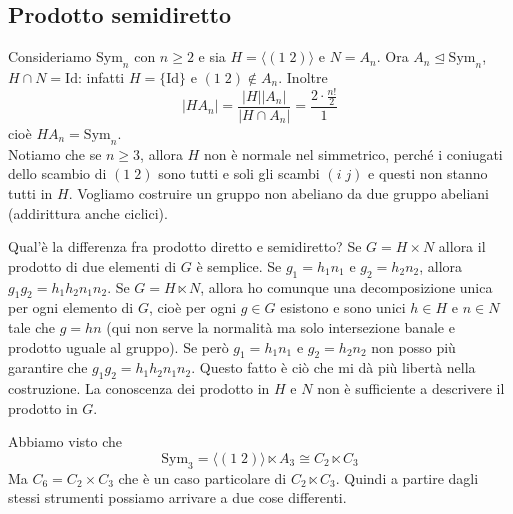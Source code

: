 \documentclass[a4paper]{article}
\begin{document}
\subsection{Prodotto semidiretto}

\begin{snippetexample}{}
    Consideriamo \(\text{Sym}_n\) con \(n \geq 2\)
    e sia \(H = \langle (1\; 2) \rangle\)
    e \(N = A_n\).
    Ora \(A_n \unlhd \text{Sym}_n\),
    \(H \cap N = \text{Id}\):
    infatti \(H = \{\text{Id}\}\) e \((1\;2) \notin A_n\).
    Inoltre
    \[
        |HA_n| = \frac{|H||A_n|}{|H \cap A_n|} = \frac{2\cdot \frac{n!}{2}}{1}
    \]
    cioè \(HA_n = \text{Sym}_n\). \\
    Notiamo che se \(n \geq 3\), allora \(H\) non è normale nel simmetrico,
    perché i coniugati dello scambio di \((1\;2)\) sono tutti e soli gli scambi
    \((i\;j)\) e questi non stanno tutti in \(H\).
    Vogliamo costruire un gruppo non abeliano da due gruppo abeliani (addirittura anche ciclici).
\end{snippetexample}

Qual'è la differenza fra prodotto diretto e semidiretto?
Se \(G = H \times N\) allora il prodotto di due elementi di \(G\)
è semplice. Se \(g_1 = h_1n_1\) e \(g_2 = h_2n_2\),
allora \(g_1g_2 = h_1h_2n_1n_2\).
Se \(G = H \ltimes N\), allora ho comunque una decomposizione unica per ogni elemento di \(G\),
cioè per ogni \(g\in G\) esistono e sono unici \(h\in H\) e \(n\in N\)
tale che \(g = hn\)
(qui non serve la normalità ma solo intersezione banale e prodotto uguale al gruppo).
Se però \(g_1 = h_1 n_1\) e \(g_2 = h_2n_2\) non posso più garantire che
\(g_1g_2 = h_1h_2n_1n_2\).
Questo fatto è ciò che mi dà più libertà nella costruzione.
La conoscenza dei prodotto in \(H\) e \(N\) non è sufficiente a descrivere
il prodotto in \(G\).

\begin{snippetexample}{}
    Abbiamo visto che \[
        \text{Sym}_3 = \langle (1\;2)\rangle \ltimes A_3 \cong C_2 \ltimes C_3
    \]
    Ma \(C_6 = C_2 \times C_3\) che è un caso particolare di \(C_2 \ltimes C_3\).
    Quindi a partire dagli stessi strumenti possiamo arrivare a due cose differenti.
\end{snippetexample}
\end{document}
